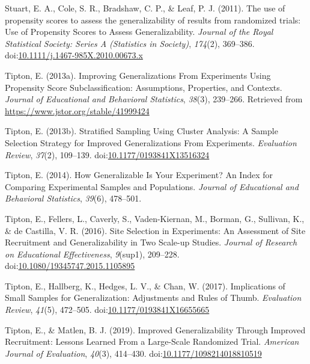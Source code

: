 \documentclass[man,floatsintext]{apa6}
\begin{document}
\leavevmode\hypertarget{ref-stuartUsePropensityScores2011}{}%
Stuart, E. A., Cole, S. R., Bradshaw, C. P., \& Leaf, P. J. (2011). The use of propensity scores to assess the generalizability of results from randomized trials: Use of Propensity Scores to Assess Generalizability. \emph{Journal of the Royal Statistical Society: Series A (Statistics in Society)}, \emph{174}(2), 369--386. doi:\href{https://doi.org/10.1111/j.1467-985X.2010.00673.x}{10.1111/j.1467-985X.2010.00673.x}

\leavevmode\hypertarget{ref-tiptonImprovingGeneralizationsExperiments2013}{}%
Tipton, E. (2013a). Improving Generalizations From Experiments Using Propensity Score Subclassification: Assumptions, Properties, and Contexts. \emph{Journal of Educational and Behavioral Statistics}, \emph{38}(3), 239--266. Retrieved from \url{https://www.jstor.org/stable/41999424}

\leavevmode\hypertarget{ref-tiptonStratifiedSamplingUsing2013}{}%
Tipton, E. (2013b). Stratified Sampling Using Cluster Analysis: A Sample Selection Strategy for Improved Generalizations From Experiments. \emph{Evaluation Review}, \emph{37}(2), 109--139. doi:\href{https://doi.org/10.1177/0193841X13516324}{10.1177/0193841X13516324}

\leavevmode\hypertarget{ref-tiptonHowGeneralizableYour2014}{}%
Tipton, E. (2014). How Generalizable Is Your Experiment? An Index for Comparing Experimental Samples and Populations. \emph{Journal of Educational and Behavioral Statistics}, \emph{39}(6), 478--501.

\leavevmode\hypertarget{ref-tiptonSiteSelectionExperiments2016}{}%
Tipton, E., Fellers, L., Caverly, S., Vaden-Kiernan, M., Borman, G., Sullivan, K., \& de Castilla, V. R. (2016). Site Selection in Experiments: An Assessment of Site Recruitment and Generalizability in Two Scale-up Studies. \emph{Journal of Research on Educational Effectiveness}, \emph{9}(sup1), 209--228. doi:\href{https://doi.org/10.1080/19345747.2015.1105895}{10.1080/19345747.2015.1105895}

\leavevmode\hypertarget{ref-tiptonImplicationsSmallSamples2017}{}%
Tipton, E., Hallberg, K., Hedges, L. V., \& Chan, W. (2017). Implications of Small Samples for Generalization: Adjustments and Rules of Thumb. \emph{Evaluation Review}, \emph{41}(5), 472--505. doi:\href{https://doi.org/10.1177/0193841X16655665}{10.1177/0193841X16655665}

\leavevmode\hypertarget{ref-tiptonImprovedGeneralizabilityImproved2019}{}%
Tipton, E., \& Matlen, B. J. (2019). Improved Generalizability Through Improved Recruitment: Lessons Learned From a Large-Scale Randomized Trial. \emph{American Journal of Evaluation}, \emph{40}(3), 414--430. doi:\href{https://doi.org/10.1177/1098214018810519}{10.1177/1098214018810519}

\endgroup
\end{document}
